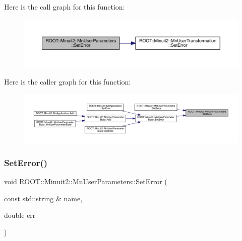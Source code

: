 Here is the call graph for this function\+:\nopagebreak
\begin{figure}[H]
\begin{center}
\leavevmode
\includegraphics[width=350pt]{d6/d10/classROOT_1_1Minuit2_1_1MnUserParameters_a64cbb6833d91d7f3bdef5b4dec9ae20f_cgraph}
\end{center}
\end{figure}
Here is the caller graph for this function\+:\nopagebreak
\begin{figure}[H]
\begin{center}
\leavevmode
\includegraphics[width=350pt]{d6/d10/classROOT_1_1Minuit2_1_1MnUserParameters_a64cbb6833d91d7f3bdef5b4dec9ae20f_icgraph}
\end{center}
\end{figure}
\mbox{\label{classROOT_1_1Minuit2_1_1MnUserParameters_aa3d8a9df23458438ccff06800d7c9af2}} 
\subsubsection{\texorpdfstring{SetError()}{SetError()}\hspace{0.1cm}{\footnotesize\ttfamily [3/4]}}
{\footnotesize\ttfamily void R\+O\+O\+T\+::\+Minuit2\+::\+Mn\+User\+Parameters\+::\+Set\+Error (\begin{DoxyParamCaption}\item[{const std\+::string \&}]{name,  }\item[{double}]{err }\end{DoxyParamCaption})}

